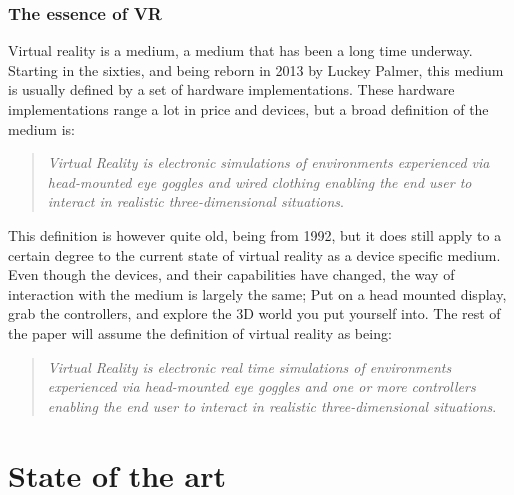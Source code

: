 		
		\subsubsection{The essence of VR}
		Virtual reality is a medium\cite{definingVirtualReality}, a medium that has been a long time underway. Starting in the sixties, and being reborn in 2013 by Luckey Palmer, this medium is usually defined by a set of hardware implementations. These hardware implementations range a lot in price and devices, but a broad definition of the medium is:\\
		
		\begin{quote}
			\textit{Virtual Reality is electronic simulations of environments experienced via head-mounted eye goggles and wired clothing enabling the end user to interact in realistic three-dimensional situations}\cite{coates1992}.\\
		\end{quote}
		
		This definition is however quite old, being from 1992, but it does still apply to a certain degree to the current state of virtual reality as a device specific medium. Even though the devices, and their capabilities have changed, the way of interaction with the medium is largely the same; Put on a head mounted display, grab the controllers, and explore the 3D world you put yourself into. The rest of the paper will assume the definition of virtual reality as being:\\
		\begin{quote}
			\textit{Virtual Reality is electronic real time simulations of environments experienced via head-mounted eye goggles and one or more controllers enabling the end user to interact in realistic three-dimensional situations}\label{def:virtualRealityDefinition}.\\
		\end{quote}
		

    \section{State of the art}\label{sec:SOTA}
	  
